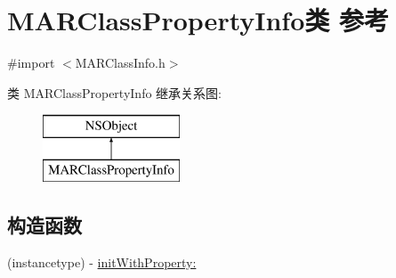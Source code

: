 \hypertarget{interface_m_a_r_class_property_info}{}\section{M\+A\+R\+Class\+Property\+Info类 参考}
\label{interface_m_a_r_class_property_info}


{\ttfamily \#import $<$M\+A\+R\+Class\+Info.\+h$>$}

类 M\+A\+R\+Class\+Property\+Info 继承关系图\+:\begin{figure}[H]
\begin{center}
\leavevmode
\includegraphics[height=2.000000cm]{interface_m_a_r_class_property_info}
\end{center}
\end{figure}
\subsection*{构造函数}
\begin{DoxyCompactItemize}
\item 
(instancetype) -\/ \hyperlink{interface_m_a_r_class_property_info_afa1f3862f32fdfe20c54eab41ad7f63b}{init\+With\+Property\+:}
\end{DoxyCompactItemize}
